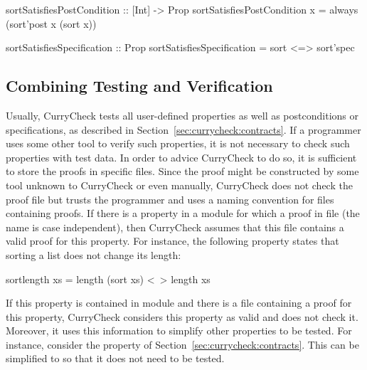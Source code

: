 \begin{curry}
sortSatisfiesPostCondition :: [Int] -> Prop
sortSatisfiesPostCondition x = always (sort'post x (sort x))

sortSatisfiesSpecification :: Prop
sortSatisfiesSpecification = sort <=> sort'spec
\end{curry}


\subsection{Combining Testing and Verification}

Usually, CurryCheck tests all user-defined properties as well as
postconditions or specifications,
as described in Section~\ref{sec:currycheck:contracts}.
If a programmer uses some other tool to verify such properties,
it is not necessary to check such properties with test data.
In order to advice CurryCheck to do so,
it is sufficient to store the proofs in specific files.
Since the proof might be constructed by some tool
unknown to CurryCheck or even manually,
CurryCheck does not check the proof file but trusts the programmer
and uses a naming convention for files containing proofs.
If there is a property  in a module 
for which a proof in file 
(the name is case independent), then
CurryCheck assumes that this file contains
a valid proof for this property.
For instance, the following property states that
sorting a list does not change its length:
%
\begin{curry}
sortlength xs = length (sort xs) <~> length xs
\end{curry}
%
If this property is contained in module  and
there is a file 
containing a proof for this property,
CurryCheck considers this property as valid and does not check it.
Moreover, it uses this information to simplify other properties to be tested.
For instance, consider the property 
of Section~\ref{sec:currycheck:contracts}.
This can be simplified to
 so that it does not need to be tested.

